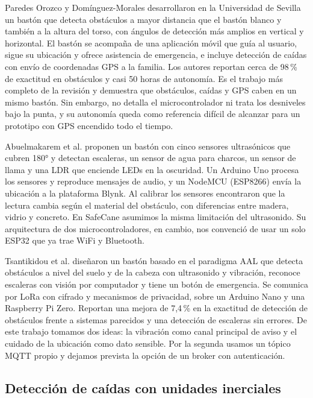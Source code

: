 \documentclass[conference,a4paper]{IEEEtran}
\begin{document}
Paredes Orozco y Domínguez-Morales \cite{paredes} desarrollaron en la Universidad de Sevilla un bastón que detecta obstáculos a mayor distancia que el bastón blanco y también a la altura del torso, con ángulos de detección más amplios en vertical y horizontal. El bastón se acompaña de una aplicación móvil que guía al usuario, sigue su ubicación y ofrece asistencia de emergencia, e incluye detección de caídas con envío de coordenadas GPS a la familia. Los autores reportan cerca de 98\,\% de exactitud en obstáculos y casi 50 horas de autonomía. Es el trabajo más completo de la revisión y demuestra que obstáculos, caídas y GPS caben en un mismo bastón. Sin embargo, no detalla el microcontrolador ni trata los desniveles bajo la punta, y su autonomía queda como referencia difícil de alcanzar para un prototipo con GPS encendido todo el tiempo.

Abuelmakarem et al. \cite{abuelmakarem} proponen un bastón con cinco sensores ultrasónicos que cubren 180° y detectan escaleras, un sensor de agua para charcos, un sensor de llama y una LDR que enciende LEDs en la oscuridad. Un Arduino Uno procesa los sensores y reproduce mensajes de audio, y un NodeMCU (ESP8266) envía la ubicación a la plataforma Blynk. Al calibrar los sensores encontraron que la lectura cambia según el material del obstáculo, con diferencias entre madera, vidrio y concreto. En SafeCane asumimos la misma limitación del ultrasonido. Su arquitectura de dos microcontroladores, en cambio, nos convenció de usar un solo ESP32 que ya trae WiFi y Bluetooth.

Tsantikidou et al. \cite{tsantikidou} diseñaron un bastón basado en el paradigma AAL que detecta obstáculos a nivel del suelo y de la cabeza con ultrasonido y vibración, reconoce escaleras con visión por computador y tiene un botón de emergencia. Se comunica por LoRa con cifrado y mecanismos de privacidad, sobre un Arduino Nano y una Raspberry Pi Zero. Reportan una mejora de 7,4\,\% en la exactitud de detección de obstáculos frente a sistemas parecidos y una detección de escaleras sin errores. De este trabajo tomamos dos ideas: la vibración como canal principal de aviso y el cuidado de la ubicación como dato sensible. Por la segunda usamos un tópico MQTT propio y dejamos prevista la opción de un broker con autenticación.

\subsection{Detección de caídas con unidades inerciales}
\end{document}
